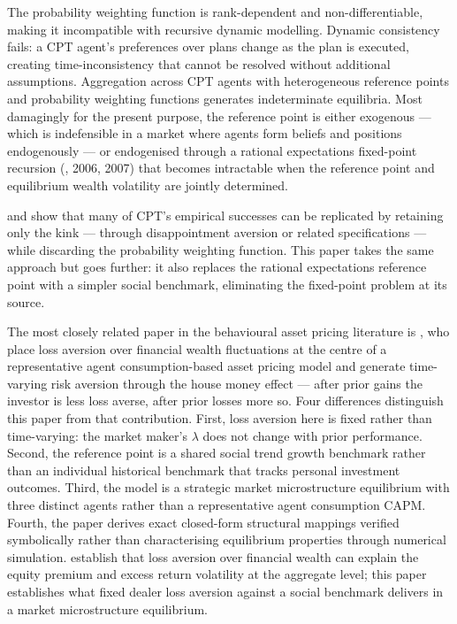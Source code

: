 \documentclass[12pt,a4paper]{article}
\theoremstyle{definition}
\begin{document}
The probability weighting function is rank-dependent and non-differentiable,
making it incompatible with recursive dynamic modelling. Dynamic consistency
fails: a CPT agent's preferences over plans change as the plan is executed,
creating time-inconsistency that cannot be resolved without additional
assumptions. Aggregation across CPT agents with heterogeneous reference points
and probability weighting functions generates indeterminate equilibria.
Most damagingly for the present purpose, the reference point is either
exogenous --- which is indefensible in a market where agents form beliefs and
positions endogenously --- or endogenised through a rational expectations
fixed-point recursion (\citet{koszegi2006,koszegi2007}, 2006, 2007) that becomes
intractable when the reference point and equilibrium wealth volatility are
jointly determined.

\citet{ang2005} and \citet{routledge2010} show that many of
CPT's empirical successes can be replicated by retaining only the kink ---
through disappointment aversion or related specifications --- while discarding
the probability weighting function. This paper takes the same approach but
goes further: it also replaces the rational expectations reference point with
a simpler social benchmark, eliminating the fixed-point problem at its source.

The most closely related paper in the behavioural asset pricing literature
is \citet{barberis2001}, who place loss aversion over financial
wealth fluctuations at the centre of a representative agent consumption-based
asset pricing model and generate time-varying risk aversion through the house
money effect --- after prior gains the investor is less loss averse, after
prior losses more so. Four differences distinguish this paper from that
contribution. First, loss aversion here is fixed rather than time-varying:
the market maker's $\lambda$ does not change with prior performance. Second,
the reference point is a shared social trend growth benchmark rather than
an individual historical benchmark that tracks personal investment outcomes.
Third, the model is a strategic market microstructure equilibrium with three
distinct agents rather than a representative agent consumption CAPM. Fourth,
the paper derives exact closed-form structural mappings verified symbolically
rather than characterising equilibrium properties through numerical simulation.
\citet{barberis2001} establish that loss aversion over financial
wealth can explain the equity premium and excess return volatility at the
aggregate level; this paper establishes what fixed dealer loss aversion
against a social benchmark delivers in a market microstructure equilibrium.
\end{document}
